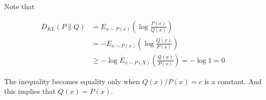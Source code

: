 \begin{answer}

    Note that 

    $$
    \begin{aligned}
        D_{KL}(P\|Q)  &= E_{x \sim P(x)}(\log \frac{P(x)}{Q(x)}) \\
        &= -E_{x\sim P(x)}(\log\frac{Q(x)}{P(x)})\\
        &\ge -\log E_{x\sim P(X)}(\frac{Q(x)}{P(x)})    = -\log 1 = 0
    \end{aligned}
    $$

    The inequality becomes equality only when $Q(x) / P(x) = c$ is a constant. And this implies that $Q(x) = P(x)$.

\end{answer}

